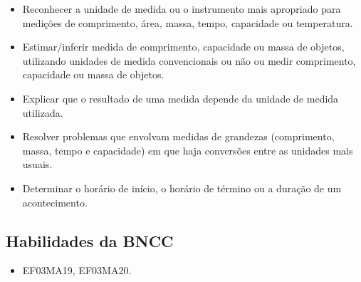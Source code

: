 \begin{itemize}
\item Reconhecer a unidade de medida ou o instrumento mais apropriado para
medições de comprimento, área, massa, tempo, capacidade ou temperatura.

\item Estimar/inferir medida de comprimento, capacidade ou massa de objetos,
utilizando unidades de medida convencionais ou não ou medir comprimento,
capacidade ou massa de objetos.

\item Explicar que o resultado de uma medida depende da unidade de medida
utilizada.

\item Resolver problemas que envolvam medidas de grandezas (comprimento,
massa, tempo e capacidade) em que haja conversões entre as unidades mais
usuais.

\item Determinar o horário de início, o horário de término ou a duração de
um acontecimento.
\end{itemize}

\subsection{Habilidades da BNCC}

\begin{itemize}
\item EF03MA19, EF03MA20.
\end{itemize}






